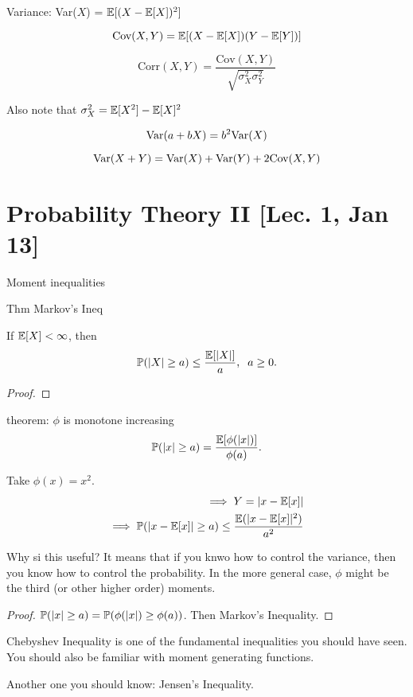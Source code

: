 Variance: Var($X$) = $\mathbb{E}[(X - \mathbb{E}[X])^2]$

\[ 
	\text{Cov}(X, Y) = \mathbb{E}[(X - \mathbb{E}[X])(Y - \mathbb{E}[Y])]
\]

\[
	\text{Corr}(X, Y) = \frac{ \text{Cov}(X, Y)}{ \sqrt{\sigma_X^2 \sigma_Y^2} }	
\]

Also note that $\sigma_X^2 = \mathbb{E}[X^2] - \mathbb{E}[X]^2$

\[ \text{Var}(a + bX) = b^2 \text{Var}(X) \]

\[ \text{Var}(X + Y) = \text{Var}(X) + \text{Var}(Y) + 2\text{Cov}(X, Y) \]


\section{Probability Theory II [Lec. 1, Jan 13]}

Moment inequalities

Thm Markov's Ineq

If $\mathbb{E}[X] <\infty$, then 
\[ \mathbb{P}(|X| \geq a) \leq \frac{\mathbb{E}[|X|]}{a}, \;\; a\geq 0 . \]

\begin{proof}
	
\end{proof}

theorem:
$\phi$ is monotone increasing
\[ \mathbb{P}(|x| \geq a)  = \frac{\mathbb{E}[ \phi(|x|)]}{ \phi(a)}.\]

Take $\phi(x) = x^2$.
\[
\begin{aligned}
\implies Y = |x - \mathbb{E}[x]| \\
\implies \mathbb{P}(|x - \mathbb{E}[x]| \geq a) \leq \frac{ \mathbb{E}(|x - \mathbb{E}[x]|^2) }{ a^2 }
\end{aligned}
\]




Why si this useful? It means that if you knwo how to control the variance, then you know how to control the probability. In the more general case, $\phi$ might be the third (or other higher order) moments.

\begin{proof}
$\mathbb{P}(|x| \geq a) = \mathbb{P}( \phi(|x|) \geq \phi(a) )$. Then Markov's Inequality.
\end{proof}


Chebyshev Inequality is one of the fundamental inequalities you should have seen. You should also be familiar with moment generating functions.

Another one you should know: Jensen's Inequality.

